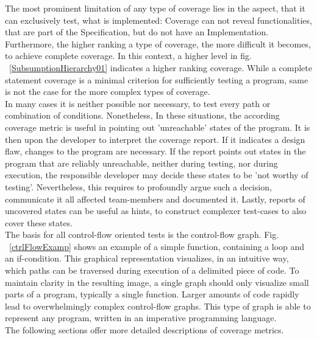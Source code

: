 	The most prominent limitation of any type of coverage lies in the aspect, that it can exclusively test, what is implemented: Coverage can not reveal functionalities, that are part of the Specification, but do not have an Implementation. \\	
	Furthermore, the higher ranking a type of coverage, the more difficult it becomes, to achieve complete coverage. In this context, a higher level in fig. ~\ref{SubsumptionHierarchy01}  indicates a higher ranking coverage. While a complete statement coverage is a minimal criterion for sufficiently testing a program, same is not the case for the more complex types of coverage. \\
	In many cases it is neither possible nor necessary, to test every path or combination of conditions. Nonetheless, In these situations, the according coverage metric is useful in pointing out 'unreachable' states of the program. It is then upon the developer to interpret the coverage report. If it indicates a design flaw, changes to the program are necessary. If the report points out states in the program that are reliably unreachable, neither during testing, nor during execution, the responsible developer may decide these states to be 'not worthy of testing'. Nevertheless, this requires to profoundly argue such a decision, communicate it all affected team-members and documented it. Lastly, reports of uncovered states can be useful as hints, to construct complexer test-cases to also cover these states. \\


	The basis for all control-flow oriented tests is the control-flow graph. Fig. ~\ref{ctrlFlowExamp} shows an example of a simple function, containing a loop and an if-condition. This graphical representation visualizes, in an intuitive way, which paths can be traversed during execution of a delimited piece of code. To maintain clarity in the resulting image, a single graph should only visualize small parts of a program, typically a single function. Larger amounts of code rapidly lead to overwhelmingly complex control-flow graphs. This type of graph is able to represent any program, written in an imperative programming language. \\
	
	The following sections offer more detailed descriptions of coverage metrics.

